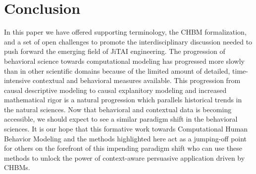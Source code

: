 \documentclass[runningheads,a4paper]{llncs}
\begin{document}
\section{Conclusion}
In this paper we have offered supporting terminology, the CHBM formalization, and a set of open challenges to promote the interdisciplinary discussion needed to push forward the emerging field of JiTAI engineering.
The progression of behavioral science towards computational modeling has progressed more slowly than in other scientific domains because of the limited amount of detailed, time-intensive contextual and behavioral measures available.
This progression from causal descriptive modeling to causal explanitory modeling and increased mathematical rigor is a natural progression which parallels historical trends in the natural sciences.
Now that behavioral and contextual data is becoming accessible, we should expect to see a similar paradigm shift in the behavioral sciences.
It is our hope that this formative work towards Computational Human Behavior Modeling and the methods highlighted here act as a jumping-off point for others on the forefront of this impending paradigm shift who can use these methods to unlock the power of context-aware persuasive application driven by CHBMs.


\end{document}
